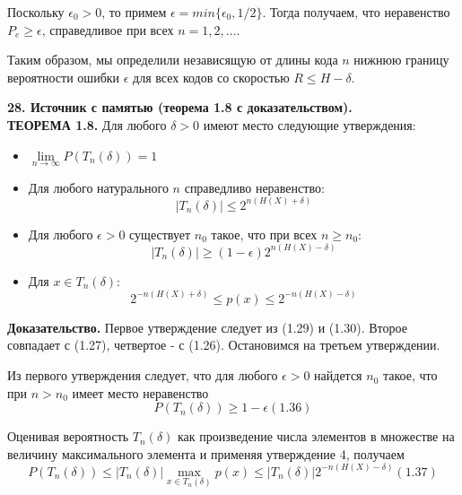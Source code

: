 \documentclass[14pt]{article}
\begin{document}
Поскольку \(\epsilon_0 > 0\), то примем \(\epsilon = min\{\epsilon_0, 1/2\}\). Тогда получаем, что неравенство \(P_e \geq \epsilon\), справедливое при всех \(n = 1,2,\ldots\).

Таким образом, мы определили независящую от длины кода \(n\) нижнюю границу вероятности ошибки \(\epsilon\) для всех кодов со скоростью \(R \leq H - \delta\).

\bigskip
\textbf{28. Источник с памятью (теорема 1.8 с доказательством).} \\

\textbf{ТЕОРЕМА 1.8.} Для любого \(\delta > 0\) имеют место следующие утверждения:
\begin{itemize}
    \item \(\lim\limits_{n \to \infty} P(T_n(\delta)) = 1\)
    \item Для любого натурального \(n\) справедливо неравенство:
        \begin{displaymath}
            |T_n(\delta)| \leq 2^{n(H(X) + \delta)}
        \end{displaymath}
    \item Для любого \(\epsilon > 0\) существует \(n_0\) такое, что при всех \(n \geq n_0\):
        \begin{displaymath}
            |T_n(\delta)| \geq (1 - \epsilon)2^{n(H(X) - \delta)}
        \end{displaymath}
    \item Для \(x \in T_n(\delta)\):
        \begin{displaymath}
            2^{-n(H(X) + \delta)} \leq p(x) \leq 2^{-n(H(X) - \delta)}
        \end{displaymath}
\end{itemize}

\textbf{Доказательство.} Первое утверждение следует из (1.29) и (1.30). Второе совпадает с (1.27), четвертое - с (1.26). Остановимся на третьем утверждении.

Из первого утверждения следует, что для любого \(\epsilon > 0\) найдется \(n_0\) такое, что при \(n > n_0\) имеет место неравенство
\begin{displaymath}
    P(T_n(\delta)) \geq 1 - \epsilon (1.36)
\end{displaymath}

Оценивая вероятность \(T_n(\delta)\) как произведение числа элементов в множестве на величину максимального элемента и применяя утверждение 4, получаем
\begin{displaymath}
    P(T_n(\delta)) \leq |T_n(\delta)| \max_{x \in T_n(\delta)} p(x) \leq |T_n(\delta)|2^{-n(H(X)-\delta)} (1.37)
\end{displaymath}
\end{document}
